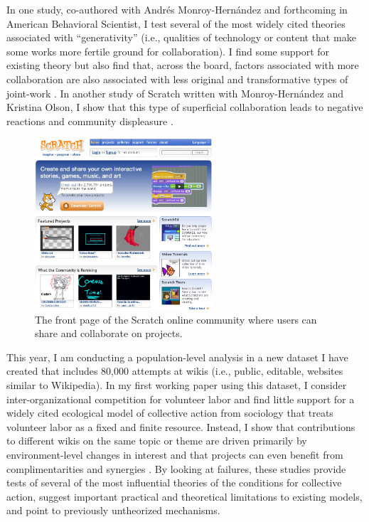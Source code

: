 \documentclass[10pt]{memoir}
\begin{document}
In one study, co-authored with Andrés Monroy-Hernández and forthcoming
in American Behavioral Scientist, I test several of the most widely
cited theories associated with ``generativity'' (i.e., qualities of
technology or content that make some works more fertile ground for
collaboration). I find some support for existing theory but also find
that, across the board, factors associated with more collaboration are
also associated with less original and transformative types of
joint-work \cite{hill_remixing_2012}. In another study of Scratch
written with Monroy-Hernández and Kristina Olson, I show that this type
of superficial collaboration leads to negative reactions and community
displeasure \cite{hill_responses_2010}.

\begin{figure}
 \vspace{-1em}
 \begin{centering}
 \includegraphics[width=2.6in]{figures/frontpage_modified-topremix.jpg}
  \caption{The front page of the Scratch online community where users
    can share and collaborate on projects.}
 \label{fig:scratchfrontpage}
 \end{centering}
 \vspace{-1.5em}
\end{figure}

This year, I am conducting a population-level analysis in a new
dataset I have created that includes 80,000 attempts at wikis (i.e.,
public, editable, websites similar to Wikipedia). In my first working
paper using this dataset, I consider inter-organizational competition
for volunteer labor and find little support for a widely cited
ecological model of collective action from sociology that treats
volunteer labor as a fixed and finite resource. Instead, I show that
contributions to different wikis on the same topic or theme are driven
primarily by environment-level changes in interest and that projects
can even benefit from complimentarities and synergies
\cite{hill_is_2012}.  By looking at failures, these studies provide
tests of several of the most influential theories of the conditions
for collective action, suggest important practical and theoretical
limitations to existing models, and point to previously untheorized
mechanisms.
\end{document}
